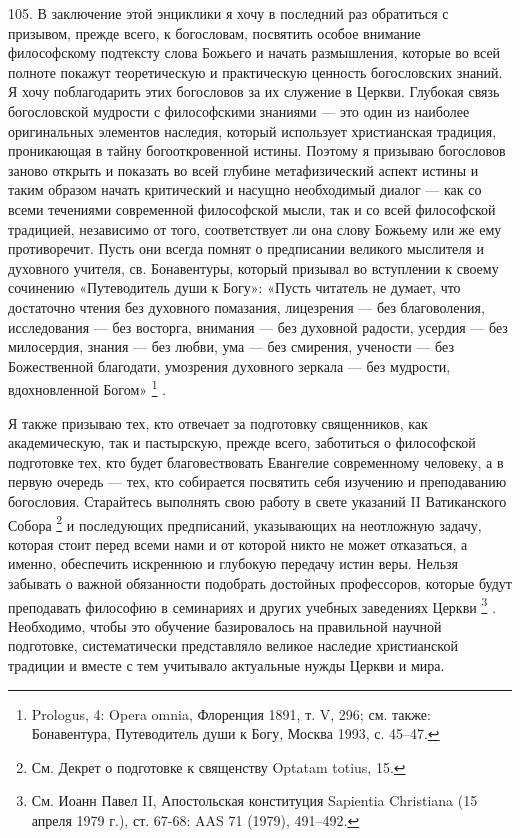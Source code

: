 \documentclass[a5paper,10pt]{article}
\begin{document}
105. В заключение этой энциклики я хочу в последний раз обратиться с призывом,
прежде всего, к богословам, посвятить особое внимание философскому подтексту
слова Божьего и начать размышления, которые во всей полноте покажут
теоретическую и практическую ценность богословских знаний. Я хочу поблагодарить
этих богословов за их служение в Церкви. Глубокая связь богословской мудрости с
философскими знаниями — это один из наиболее оригинальных элементов наследия,
который использует христианская традиция, проникающая в тайну богооткровенной
истины. Поэтому я призываю богословов заново открыть и показать во всей глубине
метафизический аспект истины и таким образом начать критический и насущно
необходимый диалог — как со всеми течениями современной философской мысли, так
и со всей философской традицией, независимо от того, соответствует ли она слову
Божьему или же ему противоречит.  Пусть они всегда помнят о предписании
великого мыслителя и духовного учителя, св. Бонавентуры, который призывал во
вступлении к своему сочинению «Путеводитель души к Богу»: «Пусть читатель не
думает, что достаточно чтения без духовного помазания, лицезрения — без
благоволения, исследования — без восторга, внимания — без духовной радости,
усердия — без милосердия, знания — без любви, ума — без смирения, учености —
без Божественной благодати, умозрения духовного зеркала — без мудрости,
вдохновленной Богом» \footnote{Prologus, 4: Opera omnia, Флоренция 1891, т. V,
296; см. также: Бонавентура, Путеводитель души к Богу, Москва 1993, с. 45–47.}
.

Я также призываю тех, кто отвечает за подготовку священников, как
академическую, так и пастырскую, прежде всего, заботиться о философской
подготовке тех, кто будет благовествовать Евангелие современному человеку, а в
первую очередь — тех, кто собирается посвятить себя изучению и преподаванию
богословия. Старайтесь выполнять свою работу в свете указаний II Ватиканского
Собора \footnote{См. Декрет о подготовке к священству Optatam totius, 15.} и
последующих предписаний, указывающих на неотложную задачу, которая стоит перед
всеми нами и от которой никто не может отказаться, а именно, обеспечить
искреннюю и глубокую передачу истин веры. Нельзя забывать о важной обязанности
подобрать достойных профессоров, которые будут преподавать философию в
семинариях и других учебных заведениях Церкви \footnote{См. Иоанн Павел II,
Апостольская конституция Sapientia Christiana (15 апреля 1979 г.), ст. 67-68:
AAS 71 (1979), 491–492.} . Необходимо, чтобы это обучение базировалось на
правильной научной подготовке, систематически представляло великое наследие
христианской традиции и вместе с тем учитывало актуальные нужды Церкви и мира.
\end{document}

